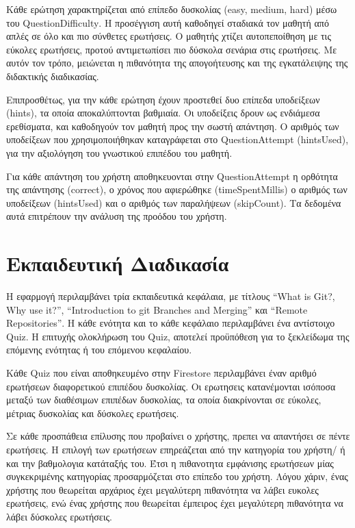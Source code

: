 \documentclass{article}
\begin{document}
Κάθε ερώτηση χαρακτηρίζεται από επίπεδο δυσκολίας \foreignlanguage{english}{(easy, medium, hard)} μέσω του \foreignlanguage{english}{QuestionDifficulty}. Η προσέγγιση αυτή καθοδηγεί σταδιακά τον μαθητή από απλές σε όλο και πιο σύνθετες ερωτήσεις. Ο μαθητής χτίζει αυτοπεποίθηση με τις εύκολες ερωτήσεις, προτού αντιμετωπίσει πιο δύσκολα σενάρια στις ερωτήσεις. Με αυτόν τον τρόπο, μειώνεται η πιθανότητα της απογοήτευσης και της εγκατάλειψης της διδακτικής διαδικασίας.

Επιπροσθέτως, για την κάθε ερώτηση έχουν προστεθεί δυο επίπεδα υποδείξεων \foreignlanguage{english}{(hints)}, τα οποία αποκαλύπτονται βαθμιαία. Οι υποδείξεις δρουν ως ενδιάμεσα ερεθίσματα, και καθοδηγούν τον μαθητή προς την σωστή απάντηση. Ο αριθμός των υποδείξεων που χρησιμοποιήθηκαν καταγράφεται στο \foreignlanguage{english}{QuestionAttempt (hintsUsed)}, για την αξιολόγηση του γνωστικού επιπέδου του μαθητή.

Για κάθε απάντηση του χρήστη αποθηκευονται στην \foreignlanguage{english}{QuestionAttempt} η ορθότητα της απάντησης \foreignlanguage{english}{(correct)}, ο χρόνος που αφιερώθηκε \foreignlanguage{english}{(timeSpentMillis)} ο αριθμός των υποδείξεων \foreignlanguage{english}{(hintsUsed)} και ο αριθμός των παραλήψεων \foreignlanguage{english}{(skipCount)}. Τα δεδομένα αυτά επιτρέπουν την ανάλυση της προόδου του χρήστη.

\newpage
\section{Εκπαιδευτική Διαδικασία}
Η εφαρμογή περιλαμβάνει τρία εκπαιδευτικά κεφάλαια, με τίτλους \foreignlanguage{english}{“What is Git?, Why use it?”, “Introduction to git Branches and Merging”} και \foreignlanguage{english}{“Remote Repositories”}. Η κάθε ενότητα και το κάθε κεφάλαιο περιλαμβάνει ένα αντίστοιχο \foreignlanguage{english}{Quiz}. Η επιτυχής ολοκλήρωση του \foreignlanguage{english}{Quiz}, αποτελεί προϋπόθεση για το ξεκλείδωμα της επόμενης ενότητας ή του επόμενου κεφαλαίου.

Κάθε \foreignlanguage{english}{Quiz} που είναι αποθηκευμένο στην \foreignlanguage{english}{Firestore} περιλαμβάνει έναν αριθμό ερωτήσεων διαφορετικού επιπέδου δυσκολίας. Οι ερωτησεις κατανέμονται ισόποσα μεταξύ των διαθέσιμων επιπέδων δυσκολίας, τα οποία διακρίνονται σε εύκολες, μέτριας δυσκολίας και δύσκολες ερωτήσεις.

Σε κάθε προσπάθεια επίλυσης που προβαίνει ο χρήστης, πρεπει να απαντήσει σε πέντε ερωτήσεις. Η επιλογή των ερωτήσεων επηρεάζεται από την κατηγορία του χρήστη/ ή και την βαθμολογια κατάταξής του. Έτσι η πιθανοτητα εμφάνισης ερωτήσεων μίας συγκεκριμένης κατηγορίας προσαρμόζεται στο επίπεδο του χρήστη. Λόγου χάριν, ένας χρήστης που θεωρείται αρχάριος έχει μεγαλύτερη πιθανότητα να λάβει ευκολες ερωτήσεις, ενώ ένας χρήστης που θεωρείται έμπειρος έχει μεγαλύτερη πιθανότητα να λάβει δύσκολες ερωτήσεις.
\end{document}
